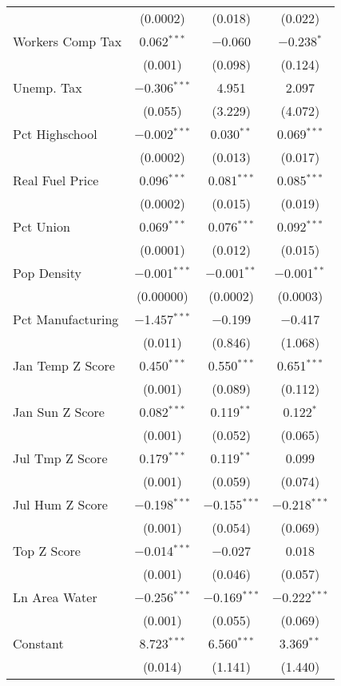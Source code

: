 \begin{table}[!htbp]
\begin{tabular}{@{\extracolsep{5pt}}lccc}
  & (0.0002) & (0.018) & (0.022) \\ 
  Workers Comp Tax & 0.062$^{***}$ & $-$0.060 & $-$0.238$^{*}$ \\ 
  & (0.001) & (0.098) & (0.124) \\ 
  Unemp. Tax & $-$0.306$^{***}$ & 4.951 & 2.097 \\ 
  & (0.055) & (3.229) & (4.072) \\ 
  Pct Highschool & $-$0.002$^{***}$ & 0.030$^{**}$ & 0.069$^{***}$ \\ 
  & (0.0002) & (0.013) & (0.017) \\ 
  Real Fuel Price & 0.096$^{***}$ & 0.081$^{***}$ & 0.085$^{***}$ \\ 
  & (0.0002) & (0.015) & (0.019) \\ 
  Pct Union & 0.069$^{***}$ & 0.076$^{***}$ & 0.092$^{***}$ \\ 
  & (0.0001) & (0.012) & (0.015) \\ 
  Pop Density & $-$0.001$^{***}$ & $-$0.001$^{**}$ & $-$0.001$^{**}$ \\ 
  & (0.00000) & (0.0002) & (0.0003) \\ 
  Pct Manufacturing & $-$1.457$^{***}$ & $-$0.199 & $-$0.417 \\ 
  & (0.011) & (0.846) & (1.068) \\ 
  Jan Temp Z Score & 0.450$^{***}$ & 0.550$^{***}$ & 0.651$^{***}$ \\ 
  & (0.001) & (0.089) & (0.112) \\ 
  Jan Sun Z Score & 0.082$^{***}$ & 0.119$^{**}$ & 0.122$^{*}$ \\ 
  & (0.001) & (0.052) & (0.065) \\ 
  Jul Tmp Z Score & 0.179$^{***}$ & 0.119$^{**}$ & 0.099 \\ 
  & (0.001) & (0.059) & (0.074) \\ 
  Jul Hum Z Score & $-$0.198$^{***}$ & $-$0.155$^{***}$ & $-$0.218$^{***}$ \\ 
  & (0.001) & (0.054) & (0.069) \\ 
  Top Z Score & $-$0.014$^{***}$ & $-$0.027 & 0.018 \\ 
  & (0.001) & (0.046) & (0.057) \\ 
  Ln Area Water & $-$0.256$^{***}$ & $-$0.169$^{***}$ & $-$0.222$^{***}$ \\ 
  & (0.001) & (0.055) & (0.069) \\ 
  Constant & 8.723$^{***}$ & 6.560$^{***}$ & 3.369$^{**}$ \\ 
  & (0.014) & (1.141) & (1.440) \\ 

\end{tabular}
\end{table}
